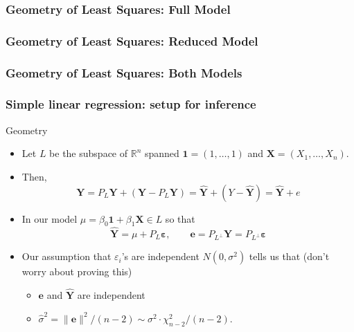 \documentclass[handout]{beamer}
\newcommand{\real}{\mathbb{R}}
\begin{document}

   \begin{frame} \frametitle{Geometry of Least Squares: Full Model}

   \end{frame}


   \begin{frame} \frametitle{Geometry of Least Squares: Reduced Model}

   \end{frame}


   \begin{frame} \frametitle{Geometry of Least Squares: Both Models}

   \end{frame}


   \begin{frame} \frametitle{Simple linear regression: setup for inference}

   \begin{block}{Geometry}

   \begin{itemize}

   \item Let $L$ be the subspace of $\real^n$ spanned $\pmb{1}=(1, \dots, 1)$ and $\pmb{X}=(X_1, \dots, X_n)$.
   \item Then,
   $$\pmb{Y} = P_L\pmb{Y} + (\pmb{Y} - P_L\pmb{Y}) = \widehat{\pmb{Y}} + (Y - \widehat{\pmb{Y}}) = \widehat{\pmb{Y}} + e$$
   \item In our model $\mu=\beta_0 \pmb{1} + \beta_1 \pmb{X} \in L$ so that
   $$
   \widehat{\pmb{Y}} = \mu + P_L\pmb{\varepsilon}, \qquad \pmb{e} = P_{L^{\perp}}{\pmb{Y}} = P_{L^{\perp}}\pmb{\varepsilon}$$
   \item Our assumption that $\varepsilon_i$'s are independent $N(0,\sigma^2)$ tells us that (don't worry about proving this)
   \begin{itemize}
   \item $\pmb{e}$ and $\widehat{\pmb{Y}}$ are independent

   \item $\widehat{\sigma}^2 = \|\pmb{e}\|^2 / (n-2) \sim \sigma^2 \cdot \chi^2_{n-2} / (n-2)$.
   \end{itemize}

   \end{itemize}
   \end{block}
   \end{frame}
\end{document}

